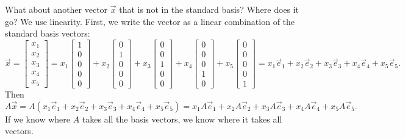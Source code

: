 What about another vector $\vec{x}$ that is not in the standard basis?
Where does it go?  We use
linearity.  First, we write the vector as a linear combination of the standard
basis vectors:
\begin{equation*}
\vec{x} =
\begin{bmatrix}
x_1 \\ x_2 \\ x_3 \\ x_4 \\ x_5
\end{bmatrix}
=
x_1
\begin{bmatrix}
1 \\ 0 \\ 0 \\ 0 \\ 0
\end{bmatrix}
+
x_2
\begin{bmatrix}
0 \\ 1 \\ 0 \\ 0 \\ 0
\end{bmatrix}
+
x_3
\begin{bmatrix}
0 \\ 0 \\ 1 \\ 0 \\ 0
\end{bmatrix}
+
x_4
\begin{bmatrix}
0 \\ 0 \\ 0 \\ 1 \\ 0
\end{bmatrix}
+
x_5
\begin{bmatrix}
0 \\ 0 \\ 0 \\ 0 \\ 1
\end{bmatrix}
=
x_1 \vec{e}_1 +
x_2 \vec{e}_2 +
x_3 \vec{e}_3 +
x_4 \vec{e}_4 +
x_5 \vec{e}_5 .
\end{equation*}
Then
\begin{equation*}
A \vec{x}
=
A (
x_1 \vec{e}_1 +
x_2 \vec{e}_2 +
x_3 \vec{e}_3 +
x_4 \vec{e}_4 +
x_5 \vec{e}_5
)
=
x_1 A\vec{e}_1 +
x_2 A\vec{e}_2 +
x_3 A\vec{e}_3 +
x_4 A\vec{e}_4 +
x_5 A\vec{e}_5 .
\end{equation*}
If we know where $A$ takes all the basis vectors, we know where it takes
all vectors.

